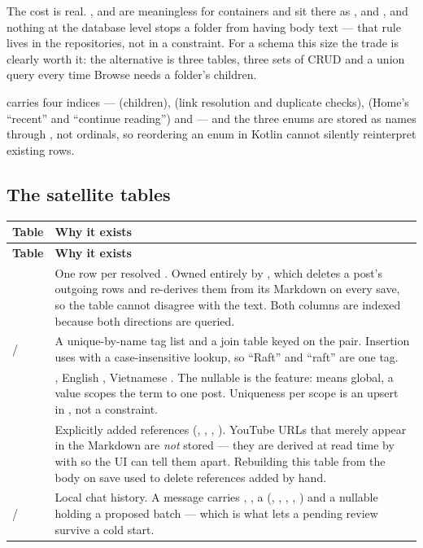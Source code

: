 The cost is real. ,  and  are meaningless for containers
and sit there as ,  and , and nothing at the database level stops a
folder from having body text --- that rule lives in the repositories, not in a constraint. For a
schema this size the trade is clearly worth it: the alternative is three tables, three sets of CRUD
and a union query every time Browse needs a folder's children.

 carries four indices ---  (children),  (link resolution and
duplicate checks),  (Home's ``recent'' and ``continue reading'') and  ---
and the three enums are stored as names through , not ordinals, so reordering an
enum in Kotlin cannot silently reinterpret existing rows.

\subsection{The satellite tables}

\begin{xltabular}{\linewidth}{L{2.5cm} X}
\toprule
\textbf{Table} & \textbf{Why it exists} \\
\midrule
\endfirsthead
\toprule
\textbf{Table} & \textbf{Why it exists} \\
\midrule
\endhead
{} & One row per resolved . Owned entirely by
, which deletes a post's outgoing rows and re-derives them from its
Markdown on every save, so the table cannot disagree with the text. Both columns are indexed because
both directions are queried. \\
\addlinespace
{} /  & A unique-by-name tag list and a join table keyed on the
 pair. Insertion uses  with a case-insensitive
lookup, so ``Raft'' and ``raft'' are one tag. \\
\addlinespace
{} & , English , Vietnamese . The
nullable  is the feature:  means global, a value scopes the term to one post.
Uniqueness per scope is an upsert in , not a constraint. \\
\addlinespace
{} & Explicitly added references (, , ,
). YouTube URLs that merely appear in the Markdown are \emph{not} stored --- they are
derived at read time by  with  so the UI can tell them
apart. Rebuilding this table from the body on save used to delete references added by hand. \\
\addlinespace
{} /  & Local chat history. A message carries ,
, a  (, , , ,
) and a nullable  holding a proposed batch --- which is what lets a
pending review survive a cold start. \\
\bottomrule
\end{xltabular}


